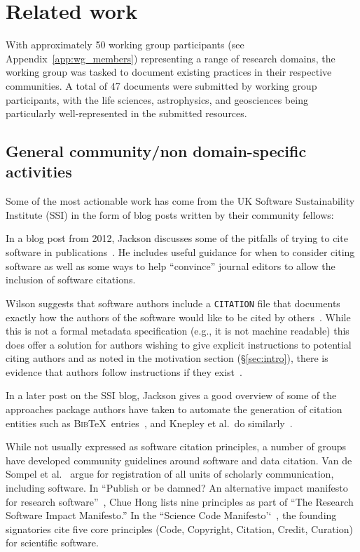 \documentclass[11pt, oneside]{amsart}
\begin{document}
\section{Related work}
\label{sec:related_work}

With approximately 50 working group participants (see Appendix~\ref{app:wg_members})
representing a range of research domains, the working group was tasked to
document existing practices in their respective communities. A total of 47
documents were submitted by working group participants, with the life sciences,
astrophysics, and geosciences being particularly well-represented in the
submitted resources.

\subsection{General community/non domain-specific activities}

Some of the most actionable work has come from the UK Software Sustainability
Institute (SSI) in the form of blog posts written by their community fellows:

In a blog post from 2012, Jackson discusses some of the pitfalls of trying to
cite software in publications~\cite{ssi-how-to-cite}. He includes useful
guidance for when to consider citing software as well as some ways to help
``convince'' journal editors to allow the inclusion of software citations.

Wilson suggests that software authors include a \texttt{CITATION} file that
documents exactly how the authors of the software would like to be cited by
others~\cite{ssi-citation-files}. While this is not a formal metadata
specification (e.g., it is not machine readable) this does offer a solution for
authors wishing to give explicit instructions to potential citing authors and as
noted in the motivation section (\S\ref{sec:intro}), there is evidence that
authors follow instructions if they exist~\cite{10.1371/journal.pone.0136631}.

In a later post on the SSI blog, Jackson gives a good overview of some of the
approaches package authors have taken to automate the generation of citation
entities such as \textsc{Bib}\TeX\ entries~\cite{ssi-how-shalt-i-cite-thee}, and
Knepley et al.\ do similarly~\cite{knepley2013accurately}.

While not usually expressed as software citation principles, a number of groups
have developed community guidelines around software and data citation. Van de
Sompel et al.~\cite{VandeSompel2004} argue for registration of all units of
scholarly communication, including software. In ``Publish or be damned? An
alternative impact manifesto for research
software''~\cite{ssi-publish-or-be-damned}, Chue Hong lists nine principles as
part of ``The Research Software Impact Manifesto.'' In the
``Science Code Manifesto'`~\cite{sciencecodemanifesto}, the founding signatories
cite five core principles (Code, Copyright, Citation, Credit, Curation) for
scientific software.
\end{document}
